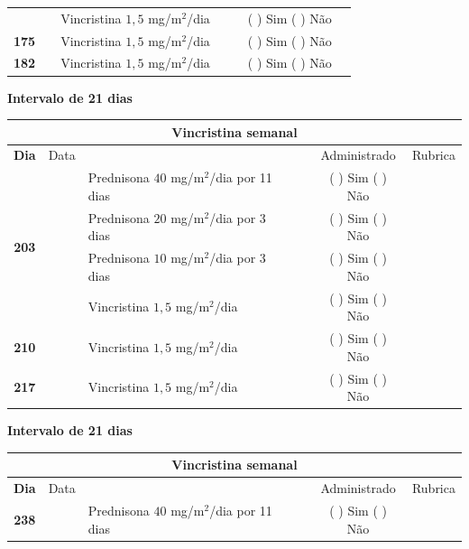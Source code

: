 \documentclass[11pt,a4paper,oldfontcommands]{memoir}
\begin{document}
\begin{center}
\begin{longtable}{p{1cm}c|p{5cm}|p{1cm}p{2cm}|c|c}
    \multicolumn{1}{c|}{\textbf{}}&&{Vincristina \(1,5\) mg/m\(^2\)/dia}&\multicolumn{1}{c}{}&&{(  ) Sim (  ) Não}&\\
    \cline{1-6}
    \multicolumn{1}{c|}{\textbf{175}}&&{Vincristina \(1,5\) mg/m\(^2\)/dia}&\multicolumn{1}{c}{}&&{(  ) Sim (  ) Não}&\\
    \cline{1-3}\cline{6-6}
    \multicolumn{1}{c|}{\textbf{182}}&&{Vincristina \(1,5\) mg/m\(^2\)/dia}&\multicolumn{1}{c}{}&&{(  ) Sim (  ) Não}&\\
    \hline
\end{longtable}
\textbf{Intervalo de 21 dias}
\begin{longtable}{p{1cm}c|p{5cm}|p{1cm}p{2cm}|c|c}
	\hline
	\multicolumn{7}{c}{Vincristina semanal} \\
	\hline
	\multicolumn{1}{c|}{\multirow{1}{*}{\textbf{Dia}}}&{Data}&{}&{}&&{Administrado}&{Rubrica} \\
    \hline
    \multicolumn{1}{c|}{\multirow{4}{*}{\textbf{203}}}&&{Prednisona \(40\) mg/m\(^2\)/dia por 11 dias}&\multicolumn{1}{c}{}&&{(  ) Sim (  ) Não}&\\
    \multicolumn{1}{c|}{}&&{Prednisona \(20\) mg/m\(^2\)/dia por 3 dias}&\multicolumn{1}{c}{}&&{(  ) Sim (  ) Não}&\\
    \multicolumn{1}{c|}{}&&{Prednisona \(10\) mg/m\(^2\)/dia por 3 dias}&\multicolumn{1}{c}{}&&{(  ) Sim (  ) Não}&\\
    \multicolumn{1}{c|}{\textbf{}}&&{Vincristina \(1,5\) mg/m\(^2\)/dia}&\multicolumn{1}{c}{}&&{(  ) Sim (  ) Não}&\\
    \cline{1-6}
    \multicolumn{1}{c|}{\textbf{210}}&&{Vincristina \(1,5\) mg/m\(^2\)/dia}&\multicolumn{1}{c}{}&&{(  ) Sim (  ) Não}&\\
    \cline{1-3}\cline{6-6}
    \multicolumn{1}{c|}{\textbf{217}}&&{Vincristina \(1,5\) mg/m\(^2\)/dia}&\multicolumn{1}{c}{}&&{(  ) Sim (  ) Não}&\\
    \hline
\end{longtable}
\textbf{Intervalo de 21 dias}
\begin{longtable}{p{1cm}c|p{5cm}|p{1cm}p{2cm}|c|c}
	\hline
	\multicolumn{7}{c}{Vincristina semanal} \\
	\hline
	\multicolumn{1}{c|}{\multirow{1}{*}{\textbf{Dia}}}&{Data}&{}&{}&&{Administrado}&{Rubrica} \\
    \hline
    \multicolumn{1}{c|}{\multirow{4}{*}{\textbf{238}}}&&{Prednisona \(40\) mg/m\(^2\)/dia por 11 dias}&\multicolumn{1}{c}{}&&{(  ) Sim (  ) Não}&\\

\end{longtable}
\end{center}
\end{document}
